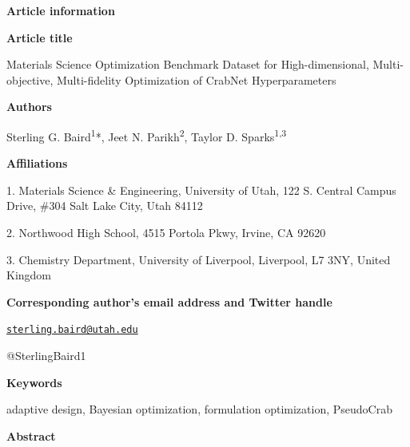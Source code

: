 \textbf{Article information}

\textbf{Article title}

Materials Science Optimization Benchmark Dataset for High-dimensional,
Multi-objective, Multi-fidelity Optimization of CrabNet Hyperparameters

\textbf{Authors}

Sterling G. Baird\textsuperscript{1}*, Jeet N.
Parikh\textsuperscript{2}, Taylor D. Sparks\textsuperscript{1,3}

\textbf{Affiliations}

1. Materials Science \& Engineering, University of Utah, 122 S. Central
Campus Drive, \#304 Salt Lake City, Utah 84112

2. Northwood High School, 4515 Portola Pkwy, Irvine, CA 92620

3. Chemistry Department, University of Liverpool, Liverpool, L7 3NY,
United Kingdom

\textbf{Corresponding author's email address and Twitter handle}

\href{mailto:sterling.baird@utah.edu}{\nolinkurl{sterling.baird@utah.edu}}

@SterlingBaird1

\textbf{Keywords}

adaptive design, Bayesian optimization, formulation optimization,
PseudoCrab

\textbf{Abstract}

